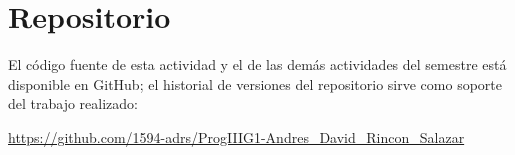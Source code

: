 \documentclass[12pt]{report}
\begin{document}
\chapter{Repositorio}

El código fuente de esta actividad y el de las demás actividades del semestre está disponible en GitHub; el historial de versiones del repositorio sirve como soporte del trabajo realizado:

\begin{center}
    \url{https://github.com/1594-adrs/ProgIIIG1-Andres_David_Rincon_Salazar}
\end{center}
\end{document}
